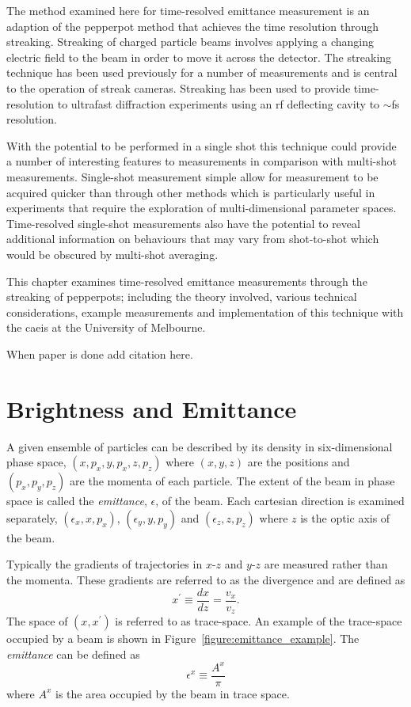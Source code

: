 The method examined here for time-resolved emittance measurement is an adaption of the pepperpot method that achieves the time resolution through streaking.
Streaking of charged particle beams involves applying a changing electric field to the beam in order to move it across the detector.
The streaking technique has been used previously for a number of measurements and is central to the operation of streak cameras.
Streaking has been used to provide time-resolution to ultrafast diffraction experiments using an rf deflecting cavity to $\sim$\unit[200]{fs} resolution\cite{li_note:_2010}.

With the potential to be performed in a single shot this technique could provide a number of interesting features to measurements in comparison with multi-shot measurements.
Single-shot measurement simple allow for measurement to be acquired quicker than through other methods which is particularly useful in experiments that require the exploration of multi-dimensional parameter spaces.
Time-resolved single-shot measurements also have the potential to reveal additional information on behaviours that may vary from shot-to-shot which would be obscured by multi-shot averaging.

This chapter examines time-resolved emittance measurements through the streaking of pepperpots; including the theory involved, various technical considerations, example measurements and implementation of this technique with the \gls{caeis} at the University of Melbourne.


{\color{red}When paper is done add citation here.}

\section{Brightness and Emittance}

A given ensemble of particles can be described by its density in six-dimensional phase space, $(x, p_x, y, p_x, z, p_z)$ where $(x, y, z)$ are the positions and $(p_x, p_y, p_z)$ are the momenta of each particle.
The extent of the beam in phase space is called the \emph{emittance}, $\epsilon$, of the beam.
Each cartesian direction is examined separately, $(\epsilon_x, x, p_x)$, $(\epsilon_y, y, p_y)$ and $(\epsilon_z, z, p_z)$ where $z$ is the optic axis of the beam.

Typically the gradients of trajectories in $x$-$z$ and $y$-$z$ are measured rather than the momenta.
These gradients are referred to as the divergence and are defined as
\begin{equation}\label{equation:divergence}
x^\prime \equiv \frac{dx}{dz} = \frac{v_x}{v_z}.
\end{equation}
The space of $(x, x^\prime)$ is referred to as trace-space.
An example of the trace-space occupied by a beam is shown in Figure~\ref{figure:emittance_example}.
The \emph{emittance} can be defined as
\begin{equation}
\epsilon^x \equiv \frac{A^x}{\pi}
\end{equation}
where $A^x$ is the area occupied by the beam in trace space.

